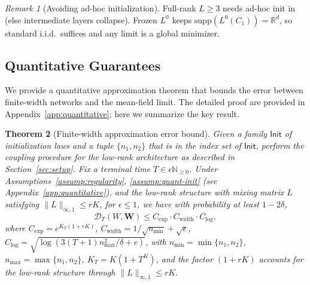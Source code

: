 \documentclass[nohyperref]{article}
\theoremstyle{plain}
\newtheorem{theorem}{Theorem}[section]
\theoremstyle{definition}
\theoremstyle{remark}
\newtheorem{remark}[theorem]{Remark}
\begin{document}
\begin{remark}[Avoiding ad-hoc initialization]
\label{rem:correlated-init}
Full-rank $L \geq 3$ needs ad-hoc init in \cite{nguyen2023rigorousframeworkmeanfield} (else intermediate layers collapse). Frozen $L^0$ keeps $\text{supp}(L^0(C_1)) = \mathbb{R}^d$, so standard i.i.d.\ suffices and any limit is a global minimizer.
\end{remark}

















\subsection{Quantitative Guarantees}
\label{sec:rate}

We provide a quantitative approximation theorem that bounds the error between finite-width networks and the mean-field limit. The detailed proof are provided in Appendix~\ref{app:quantitative}; here we summarize the key result.

\begin{theorem}[Finite-width approximation error bound]
\label{thm:quantitative-main}
Given a family $\mathsf{Init}$ of initialization laws and a tuple $\{n_1, n_2\}$ that is in the index set of $\mathsf{Init}$, perform the coupling procedure for the low-rank architecture as described in Section~\ref{sec:setup}. Fix a terminal time $T \in \epsilon\mathbb{N}_{\ge 0}$. Under Assumptions~\ref{assump:regularity}, \ref{assump:quant-init} (see Appendix~\ref{app:quantitative}), and the low-rank structure with mixing matrix $L$ satisfying $\|L\|_{\infty,1} \le rK$, for $\epsilon \le 1$, we have with probability at least $1-2\delta$,
\[
\mathscr{D}_T(W, \mathbf{W}) \le C_{\exp} \cdot C_{\text{width}} \cdot C_{\log},
\]
where $C_{\exp} = e^{K_T(1+rK)}$, $C_{\text{width}} = 1/\sqrt{n_{\min}} + \sqrt{\epsilon}$, $C_{\log} = \sqrt{\log(3(T+1)n_{\max}^2/\delta + e)}$, with $n_{\min} = \min\{n_1, n_2\}$, $n_{\max} = \max\{n_1, n_2\}$, $K_T = K(1+T^K)$, and the factor $(1+rK)$ accounts for the low-rank structure through $\|L\|_{\infty,1} \le rK$.


\end{theorem}
\end{document}

